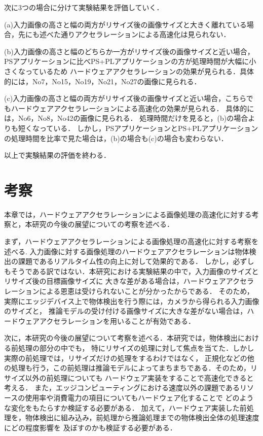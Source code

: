 \documentclass[11pt,a4j]{jreport}
\begin{document}
次に3つの場合に分けて実験結果を評価していく．

(a)入力画像の高さと幅の両方がリサイズ後の画像サイズと大きく離れている場合，先にも述べた通りアクセラレーションによる高速化は見られない．

(b)入力画像の高さと幅のどちらか一方がリサイズ後の画像サイズと近い場合，PSアプリケーションに比べPS+PLアプリケーションの方が処理時間が大幅に小さくなっているため
ハードウェアアクセラレーションの効果が見られる．具体的には，No7，No15，No19，No21，No27の画像に見られる．

(c)入力画像の高さと幅の両方がリサイズ後の画像サイズと近い場合，こちらでもハードウェアアクセラレーションによる高速化の効果が見られる．
具体的には，No6，No8，No42の画像に見られる．
処理時間だけを見ると，(b)の場合よりも短くなっている．
しかし，PSアプリケーションとPS+PLアプリケーションの処理時間を比率で見た場合は，(b)の場合も(c)の場合も変わらない．

以上で実験結果の評価を終わる．
%
\chapter{考察}
本章では，ハードウェアアクセラレーションによる画像処理の高速化に対する考察と，本研究の今後の展望についての考察を述べる．

まず，ハードウェアアクセラレーションによる画像処理の高速化に対する考察を述べる.
入力画像に対する画像処理のハードウェアアクセラレーションは物体検出の課題であるリアルタイム性の向上に対して効果的である．
しかし，必ずしもそうである訳ではない．本研究における実験結果の中で，入力画像のサイズとリサイズ後の目標画像サイズに
大きな差がある場合は，ハードウェアアクセラレーションによる恩恵は受けられないことが分かったからである．
そのため，実際にエッジデバイス上で物体検出を行う際には，カメラから得られる入力画像のサイズと，
推論モデルの受け付ける画像サイズに大きな差がない場合は，ハードウェアアクセラレーションを用いることが有効である．

次に，本研究の今後の展望について考察を述べる．本研究では，物体検出における前処理の部分の中でも，
特にリサイズの処理に対して焦点を当てた．しかし実際の前処理では，リサイズだけの処理をするわけではなく，
正規化などの他の処理も行う，この前処理は推論モデルによってまちまちである．そのため，リサイズ以外の前処理についても
ハードウェア実装をすることで高速化できると考える．
また，エッジコンピューティングにおける速度以外の課題であるリソースの使用率や消費電力の項目についてもハードウェア化することで
どのような変化をもたらすか検証する必要がある．
加えて，ハードウェア実装した前処理を，物体検出に組み込み，前処理から推論処理までの物体検出全体の処理速度にどの程度影響を
及ぼすのかも検証する必要がある．
\end{document}
